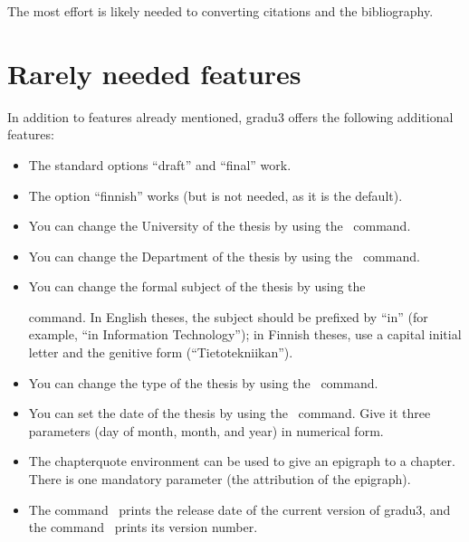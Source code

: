 \documentclass[utf8,bachelor,english]{gradu3}
\begin{document}
The most effort is likely needed to converting citations and the
bibliography.

\section{Rarely needed features}

In addition to features already mentioned, gradu3 offers the following
additional features:
\begin{itemize}
\item The standard options ``draft'' and ``final''  work.
\item The option ``finnish'' works (but is not needed, as it is the default).
\item You can change the University of the thesis by using the
  \string\university\ command.
\item You can change the Department of the thesis by using the
  \string\department\ command.
\item You can change the formal subject of the thesis by using the
  \string\subject\ command.  In English theses, the subject should be
  prefixed by ``in'' (for example, ``in Information Technology''); in
  Finnish theses, use a capital initial letter and the genitive form
  (``Tietotekniikan'').
\item You can change the type of the thesis by using the \string\type\
  command.
\item You can set the date of the thesis by using the \string\setdate\
  command.  Give it three parameters (day of month, month, and year)
  in numerical form.
\item The chapterquote environment can be used to give an epigraph to
  a chapter.  There is one mandatory parameter (the attribution of the
  epigraph).
\item The command \string\graduclsdate\ prints the release date of the
  current version of gradu3, and the command \string\graduclsversion\
  prints its version number.
\end{itemize}
\end{document}
